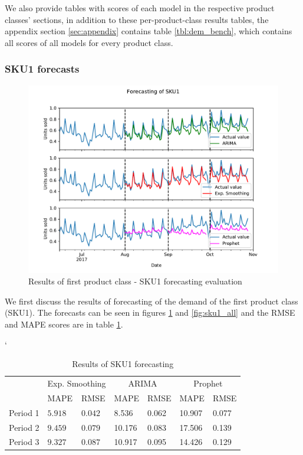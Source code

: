 \documentclass[11pt,a4paper]{article}
\begin{document}
We also provide tables with scores of each model in the respective product classes' sections, in addition to these per-product-class results tables, the appendix section \ref{sec:appendix} contains table \ref{tbl:dem_bench}, which contains all scores of all models for every product class.

\newpage
\subsubsection{SKU1 forecasts}
\begin{figure}
\centering
  \includegraphics[width=1\linewidth]{figures/SKU1_sep.pdf}
  \caption{Results of first product class - SKU1 forecasting evaluation}
  \label{fig:sku1_sep}
\end{figure}

We first discuss the results of forecasting of the demand of the first product class (SKU1).
The forecasts can be seen in figures \ref{fig:sku1_sep} and \ref{fig:sku1_all} and the RMSE and MAPE scores are in table \ref{tbl:forecast_1}.

\begin{table} \catcode`
\centering
\begin{tabular}{|l|l|l|l|l|l|l|}
\hline
\multirow{2}{*}{} & \multicolumn{2}{c|}{Exp. Smoothing} & \multicolumn{2}{c|}{ARIMA} & \multicolumn{2}{c|}{Prophet} \\ \cline{2-7} 
                  & MAPE         & RMSE        & MAPE          & RMSE          & MAPE         & RMSE         \\ \hline
Period 1 & \boldmath$5.918$\unboldmath &  \boldmath$0.042$\unboldmath & 8.536 & 0.062 & 10.907 & 0.077   \\ \hline
Period 2 & \boldmath$9.459$\unboldmath &  \boldmath$0.079$\unboldmath & 10.176 & 0.083 & 17.506 & 0.139  \\ \hline
Period 3 & \boldmath$9.327$\unboldmath &  \boldmath$0.087$\unboldmath & 10.917 & 0.095 & 14.426 & 0.129 \\ \hline
\end{tabular}
\caption{Results of SKU1 forecasting}
\label{tbl:forecast_1}
\end{table}
\end{document}
